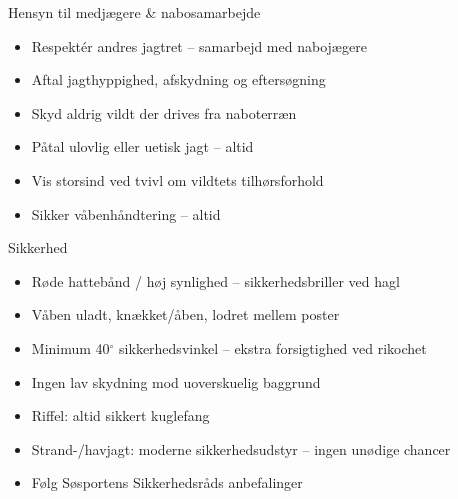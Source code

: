 \begin{frame}{Hensyn til medjægere \& nabosamarbejde}
\begin{itemize}
\item Respektér andres jagtret – samarbejd med nabojægere
\item Aftal jagthyppighed, afskydning og eftersøgning
\item Skyd aldrig vildt der drives fra naboterræn
\item Påtal ulovlig eller uetisk jagt – altid
\item Vis storsind ved tvivl om vildtets tilhørsforhold
\item Sikker våbenhåndtering – altid
\end{itemize}
\end{frame}

\begin{frame}{Sikkerhed}
\begin{itemize}
\item Røde hattebånd / høj synlighed – sikkerhedsbriller ved hagl
\item Våben uladt, knækket/åben, lodret mellem poster
\item Minimum 40$^{\circ}$ sikkerhedsvinkel – ekstra forsigtighed ved rikochet
\item Ingen lav skydning mod uoverskuelig baggrund
\item Riffel: altid sikkert kuglefang
\item Strand-/havjagt: moderne sikkerhedsudstyr – ingen unødige chancer
\item Følg Søsportens Sikkerhedsråds anbefalinger
\end{itemize}
\end{frame}